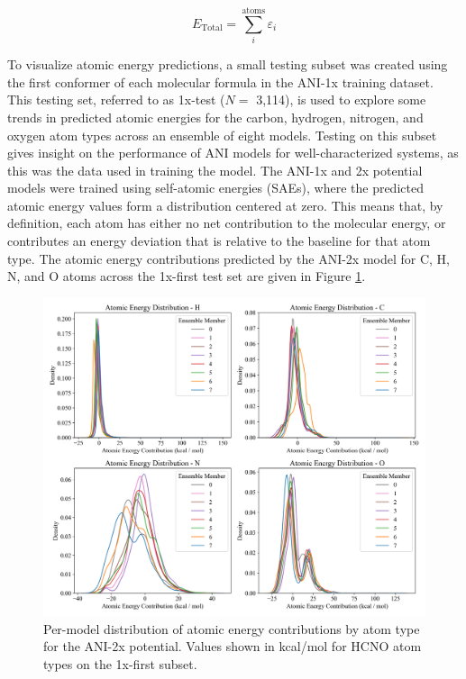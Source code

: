 \begin{equation}
    E_{\text{Total}} = \sum_{i}^{\text{atoms}} \varepsilon_i
    \label{eq:total_E_sum_AEs}
\end{equation}

To visualize atomic energy predictions, a small testing subset was created using the first conformer of each molecular formula in the ANI-1x training dataset.
This testing set, referred to as 1x-test ($N=$ 3,114), is used to explore some trends in predicted atomic energies for the carbon, hydrogen, nitrogen, and oxygen atom types across an ensemble of eight models.
Testing on this subset gives insight on the performance of ANI models for well-characterized systems, as this was the data used in training the model.
The ANI-1x and 2x potential models were trained using self-atomic energies (SAEs), where the predicted atomic energy values form a distribution centered at zero. 
This means that, by definition, each atom has either no net contribution to the molecular energy, or contributes an energy deviation that is relative to the baseline for that atom type.
The atomic energy contributions predicted by the ANI-2x model for C, H, N, and O atoms across the 1x-first test set are given in Figure \ref{fig:2x_ae_per_model}.

\begin{figure}[!h]
    \centering
    \includegraphics[width=1\linewidth]{Images/2x_outputs/2x_1x-first_ae-per-model.png}
    \caption[Atomic energies predicted by ANI-2x]{Per-model distribution of atomic energy contributions by atom type for the ANI-2x potential. Values shown in kcal/mol for HCNO atom types on the 1x-first subset.}
    \label{fig:2x_ae_per_model}
\end{figure}

